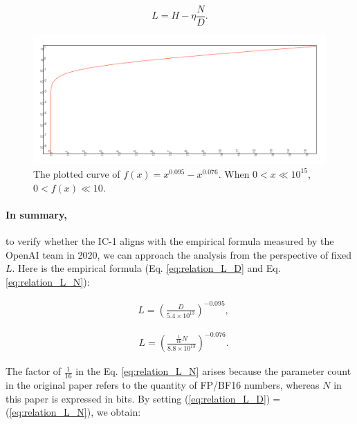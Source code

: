 \documentclass{article}
\theoremstyle{plain}
\theoremstyle{definition}
\theoremstyle{remark}
\begin{document}
\begin{equation}
\label{eq:l_relation}
    L = H-\eta \frac{N}{D}.
\end{equation}

\begin{figure}[t]
\vskip 0.2in
\begin{center}
\centerline{\includegraphics[width=1.6\columnwidth,clip,trim={20pt 20pt 20pt 30pt}]{figures/function}}
\caption{The plotted curve of $f(x)=x^{0.095}-x^{0.076}$. When $0 < x \ll 10^{15} $, $0 < f(x) \ll 10$.}
\label{fig:scale_func}
\end{center}
\vskip -0.2in
\end{figure}

\paragraph{In summary, }to verify whether the IC-1 aligns with the empirical formula measured by the OpenAI team in 2020, we can approach the analysis from the perspective of fixed $L$. Here is the empirical formula (Eq. \ref{eq:relation_L_D} and Eq. \ref{eq:relation_L_N}):

\begin{equation}
\label{eq:relation_L_D}
\begin{aligned}
    & L = \left(\frac{D}{5.4 \times 10^{13}}\right)^{-0.095}, 
\end{aligned}
\end{equation}

\begin{equation}
\label{eq:relation_L_N}
\begin{aligned}
    & L = \left(\frac{\frac{1}{16}N}{8.8 \times 10^{13}}\right)^{-0.076}. 
\end{aligned}
\end{equation}

The factor of $\frac{1}{16}$ in the Eq. \ref{eq:relation_L_N} arises because the parameter count in the original paper refers to the quantity of FP/BF16 numbers, whereas $N$ in this paper is expressed in bits. By setting (\ref{eq:relation_L_D})$=$(\ref{eq:relation_L_N}), we obtain:
\end{document}
